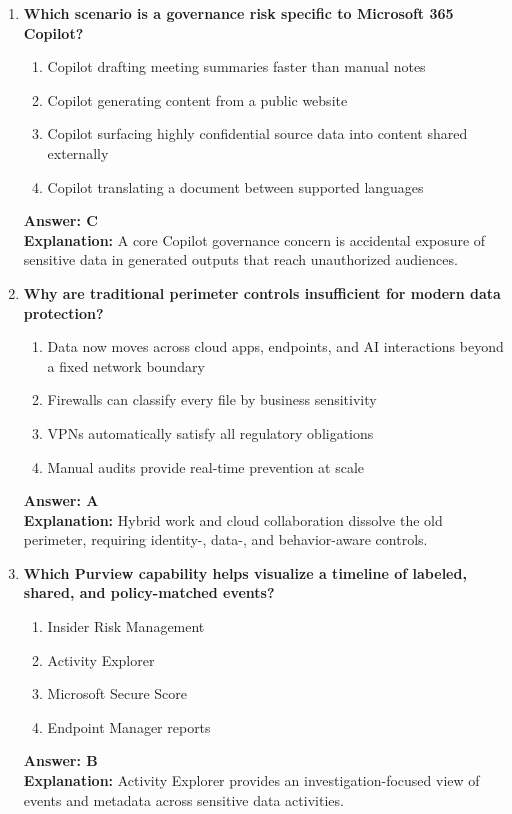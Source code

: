 \documentclass[10pt]{article}
\begin{document}
\begin{enumerate}[leftmargin=*]
\item \textbf{Which scenario is a governance risk specific to Microsoft 365 Copilot?}
\begin{enumerate}[label=\Alph*.]
  \item Copilot drafting meeting summaries faster than manual notes
  \item Copilot generating content from a public website
  \item Copilot surfacing highly confidential source data into content shared externally
  \item Copilot translating a document between supported languages
\end{enumerate}
\textbf{Answer: C}\\
\textbf{Explanation:} A core Copilot governance concern is accidental exposure of sensitive data in generated outputs that reach unauthorized audiences.

\item \textbf{Why are traditional perimeter controls insufficient for modern data protection?}
\begin{enumerate}[label=\Alph*.]
  \item Data now moves across cloud apps, endpoints, and AI interactions beyond a fixed network boundary
  \item Firewalls can classify every file by business sensitivity
  \item VPNs automatically satisfy all regulatory obligations
  \item Manual audits provide real-time prevention at scale
\end{enumerate}
\textbf{Answer: A}\\
\textbf{Explanation:} Hybrid work and cloud collaboration dissolve the old perimeter, requiring identity-, data-, and behavior-aware controls.

\item \textbf{Which Purview capability helps visualize a timeline of labeled, shared, and policy-matched events?}
\begin{enumerate}[label=\Alph*.]
  \item Insider Risk Management
  \item Activity Explorer
  \item Microsoft Secure Score
  \item Endpoint Manager reports
\end{enumerate}
\textbf{Answer: B}\\
\textbf{Explanation:} Activity Explorer provides an investigation-focused view of events and metadata across sensitive data activities.


\end{enumerate}
\end{document}
